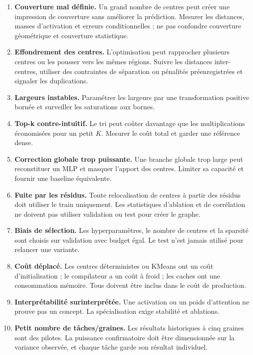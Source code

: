 \documentclass[11pt,a4paper]{article}
\begin{document}
\begin{enumerate}
  \item \textbf{Couverture mal définie.} Un grand nombre de centres peut créer une impression de couverture sans améliorer la prédiction. Mesurer les distances, masses d'activation et erreurs conditionnelles ; ne pas confondre couverture géométrique et couverture statistique.
  \item \textbf{Effondrement des centres.} L'optimisation peut rapprocher plusieurs centres ou les pousser vers les mêmes régions. Suivre les distances inter-centres, utiliser des contraintes de séparation ou pénalités préenregistrées et signaler les duplications.
  \item \textbf{Largeurs instables.} Paramétrer les largeurs par une transformation positive bornée et surveiller les saturations aux bornes.
  \item \textbf{Top-k contre-intuitif.} Le tri peut coûter davantage que les multiplications économisées pour un petit $K$. Mesurer le coût total et garder une référence dense.
  \item \textbf{Correction globale trop puissante.} Une branche globale trop large peut reconstituer un MLP et masquer l'apport des centres. Limiter sa capacité et fournir une baseline équivalente.
  \item \textbf{Fuite par les résidus.} Toute relocalisation de centres à partir des résidus doit utiliser le train uniquement. Les statistiques d'ablation et de corrélation ne doivent pas utiliser validation ou test pour créer le graphe.
  \item \textbf{Biais de sélection.} Les hyperparamètres, le nombre de centres et la sparsité sont choisis sur validation avec budget égal. Le test n'est jamais utilisé pour relancer une variante.
  \item \textbf{Coût déplacé.} Les centres déterministes ou KMeans ont un coût d'initialisation ; le compilateur a un coût à froid ; les caches ont une consommation mémoire. Tous doivent être inclus dans le coût de production.
  \item \textbf{Interprétabilité surinterprétée.} Une activation ou un poids d'attention ne prouve pas un concept. La spécialisation exige stabilité et ablations.
  \item \textbf{Petit nombre de tâches/graines.} Les résultats historiques à cinq graines sont des pilotes. La puissance confirmatoire doit être dimensionnée sur la variance observée, et chaque tâche garde son résultat individuel.
\end{enumerate}
\end{document}
